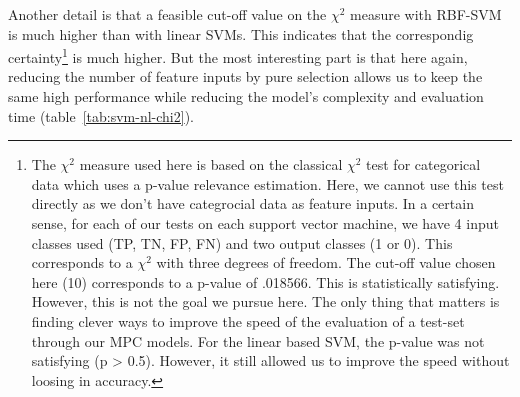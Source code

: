 Another detail is that a feasible cut-off value on the $\chi^2$ measure with RBF-SVM is much higher than with linear SVMs. This indicates that the correspondig certainty\footnote{The $\chi^2$ measure used here is based on the classical $\chi^2$ test for categorical data which uses a p-value relevance estimation. Here, we cannot use this test directly as we don't have categrocial data as feature inputs. In a certain sense, for each of our tests on each support vector machine, we have 4 input classes used (TP, TN, FP, FN) and two output classes (1 or 0). This corresponds to a $\chi^2$ with three degrees of freedom. The cut-off value chosen here (10) corresponds to a p-value of .018566. This is statistically satisfying. However, this is not the goal we pursue here. The only thing that matters is finding clever ways to improve the speed of the evaluation of a test-set through our MPC models. For the linear based SVM, the p-value was not satisfying (p > 0.5). However, it still allowed us to improve the speed without loosing in accuracy.} is much higher. But the most interesting part is that here again, reducing the number of feature inputs by pure selection allows us to keep the same high performance while reducing the model's complexity and evaluation time (table~\ref{tab:svm-nl-chi2}).

